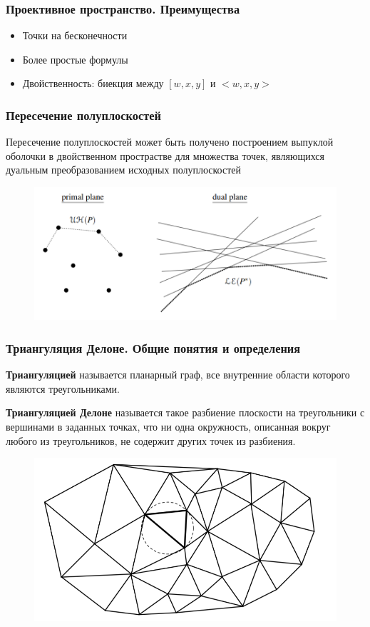 \documentclass[notheorems,aspectratio=169]{beamer}
\begin{document}
\begin{frame}\frametitle{Проективное пространство. Преимущества}
	\begin{itemize}
		\item Точки на бесконечности
		\item Более простые формулы
		\item Двойственность: биекция между $[w,x,y]$ и $<w,x,y>$
	\end{itemize}
\end{frame}

\begin{frame}\frametitle{Пересечение полуплоскостей}
	Пересечение полуплоскостей может быть получено построением выпуклой оболочки в двойственном прострастве для множества точек, являющихся дуальным преобразованием исходных полуплоскостей
	\begin{figure}
		\includegraphics[height=0.5\textheight, keepaspectratio]{duality2.png}
	\end{figure}
\end{frame}

\begin{frame}\frametitle{Триангуляция Делоне. Общие понятия и определения}
	\textbf{Триангуляцией} называется планарный граф, все внутренние области которого являются треугольниками.
	
	\textbf{Триангуляцией Делоне} называется такое разбиение плоскости на
	треугольники с вершинами в заданных точках,
	что ни одна окружность, описанная вокруг любого из треугольников, не содержит других точек из разбиения.
	\begin{figure}
		\includegraphics[height=0.5\textheight, keepaspectratio]{delone.png}
	\end{figure}
\end{frame}
\end{document}

